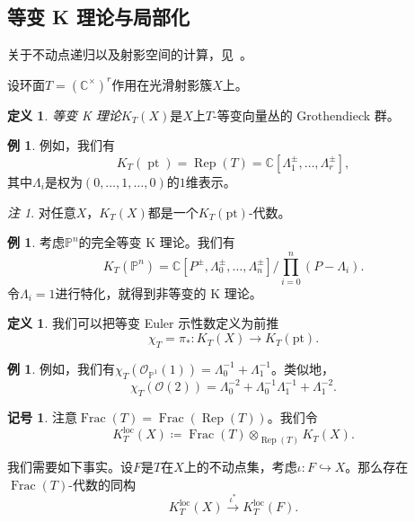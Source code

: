 \documentclass{amsart}
\theoremstyle{definition}
\newtheorem{defn}[thm]{定义}
\newtheorem{exm}[thm]{例}
\newtheorem{notn}[thm]{记号}
\theoremstyle{remark}
\newtheorem{rmk}[thm]{注}
\theoremstyle{plain}
\theoremstyle{definition}
\theoremstyle{remark}
\newcommand{\C}{\mathbb{C}}
\renewcommand{\P}{\mathbb{P}}
\newcommand{\mc}[1]{\mathcal{#1}}
\newcommand{\mr}[1]{\mathrm{#1}}
\newcommand{\on}[1]{\operatorname{#1}}
\newcommand{\1}{\mathbf{1}}
\newcommand{\2}{\mathbf{2}}
\newcommand{\3}{\mathbf{3}}
\newcommand{\loc}{\mr{loc}}
\begin{document}
\subsection{等变 K 理论与局部化}%
\label{sub:Equivariant K-theory and localization}

关于不动点递归以及射影空间的计算，见~\cite{GiventalK2}。

设环面\(T = (\C^{\times})^r\)作用在光滑射影簇\(X\)上。

\begin{defn}
    \textit{等变 K 理论}\(K_T(X)\)是\(X\)上\(T\)-等变向量丛的 Grothendieck 群。
\end{defn}

\begin{exm}
    例如，我们有
    \[ K_T(\on{pt}) = \on{Rep}(T) = \C[\Lambda_1^{\pm}, \ldots, \Lambda_r^{\pm}], \]
    其中\(\Lambda_i\)是权为\((0, \ldots, 1, \ldots, 0)\)的\(1\)维表示。
\end{exm}

\begin{rmk}
    对任意\(X\)，\(K_T(X)\)都是一个\(K_T(\mr{pt})\)-代数。
\end{rmk}

\begin{exm}
    考虑\(\P^n\)的完全等变 K 理论。我们有
    \[ K_T(\P^n) = \C[P^{\pm}, \Lambda_0^{\pm}, \ldots, \Lambda_n^{\pm}] \big/ \prod_{i=0}^n (P-\Lambda_i). \]
    令\(\Lambda_i = 1\)进行特化，就得到非等变的 K 理论。
\end{exm}

\begin{defn}
    我们可以把等变 Euler 示性数定义为前推
    \[ \chi_T = \pi_* \colon K_T(X) \to K_T(\mr{pt}). \]
\end{defn}

\begin{exm}
    例如，我们有\(\chi_T(\mc{O}_{\P^1}(1)) = \Lambda_0^{-1} + \Lambda_1^{-1}\)。类似地，
    \[ \chi_T(\mc{O}(2)) = \Lambda_0^{-2} + \Lambda_0^{-1} \Lambda_1^{-1} + \Lambda_1^{-2}. \]
\end{exm}

\begin{notn}
    注意\(\on{Frac}(T) = \on{Frac}(\on{Rep}(T))\)。我们令
    \[ K_T^{\loc}(X) \coloneqq \on{Frac}(T) \otimes_{\on{Rep}(T)} K_T(X). \]
\end{notn}

我们需要如下事实。设\(F\)是\(T\)在\(X\)上的不动点集，考虑\(\iota \colon F \hookrightarrow X\)。那么存在\(\on{Frac}(T)\)-代数的同构
\[ K_T^{\loc}(X) \xrightarrow{\iota^*} K_T^{\loc}(F). \]
\end{document}

